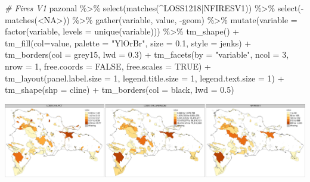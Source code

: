 \documentclass[10pt,landscape,a3paper]{article}
\newenvironment{Shaded}{\begin{snugshade}}{\end{snugshade}}
\newcommand{\AttributeTok}[1]{\textcolor[rgb]{0.77,0.63,0.00}{#1}}
\newcommand{\CommentTok}[1]{\textcolor[rgb]{0.56,0.35,0.01}{\textit{#1}}}
\newcommand{\ConstantTok}[1]{\textcolor[rgb]{0.00,0.00,0.00}{#1}}
\newcommand{\DecValTok}[1]{\textcolor[rgb]{0.00,0.00,0.81}{#1}}
\newcommand{\FloatTok}[1]{\textcolor[rgb]{0.00,0.00,0.81}{#1}}
\newcommand{\FunctionTok}[1]{\textcolor[rgb]{0.00,0.00,0.00}{#1}}
\newcommand{\NormalTok}[1]{#1}
\newcommand{\SpecialCharTok}[1]{\textcolor[rgb]{0.00,0.00,0.00}{#1}}
\newcommand{\StringTok}[1]{\textcolor[rgb]{0.31,0.60,0.02}{#1}}
\begin{document}
\begin{Shaded}
\begin{Highlighting}[]

\CommentTok{\# Fires V1}
\NormalTok{pazonal }\SpecialCharTok{\%\textgreater{}\%} \FunctionTok{select}\NormalTok{(}\FunctionTok{matches}\NormalTok{(}\StringTok{\textquotesingle{}\^{}LOSS1218|NFIRESV1\textquotesingle{}}\NormalTok{)) }\SpecialCharTok{\%\textgreater{}\%} \FunctionTok{select}\NormalTok{(}\SpecialCharTok{{-}}\FunctionTok{matches}\NormalTok{(}\StringTok{\textquotesingle{}\textless{}NA\textgreater{}\textquotesingle{}}\NormalTok{)) }\SpecialCharTok{\%\textgreater{}\%} 
  \FunctionTok{gather}\NormalTok{(variable, value, }\SpecialCharTok{{-}}\NormalTok{geom) }\SpecialCharTok{\%\textgreater{}\%}
  \FunctionTok{mutate}\NormalTok{(}\AttributeTok{variable =} \FunctionTok{factor}\NormalTok{(variable, }\AttributeTok{levels =} \FunctionTok{unique}\NormalTok{(variable))) }\SpecialCharTok{\%\textgreater{}\%} 
  \FunctionTok{tm\_shape}\NormalTok{() }\SpecialCharTok{+}
  \FunctionTok{tm\_fill}\NormalTok{(}\AttributeTok{col=}\StringTok{\textquotesingle{}value\textquotesingle{}}\NormalTok{, }\AttributeTok{palette =} \StringTok{"YlOrBr"}\NormalTok{, }\AttributeTok{size =} \FloatTok{0.1}\NormalTok{, }\AttributeTok{style =} \StringTok{\textquotesingle{}jenks\textquotesingle{}}\NormalTok{) }\SpecialCharTok{+}
  \FunctionTok{tm\_borders}\NormalTok{(}\AttributeTok{col =} \StringTok{\textquotesingle{}grey15\textquotesingle{}}\NormalTok{, }\AttributeTok{lwd =} \FloatTok{0.3}\NormalTok{) }\SpecialCharTok{+}
  \FunctionTok{tm\_facets}\NormalTok{(}\AttributeTok{by =} \StringTok{"variable"}\NormalTok{, }\AttributeTok{ncol =} \DecValTok{3}\NormalTok{, }\AttributeTok{nrow =} \DecValTok{1}\NormalTok{, }\AttributeTok{free.coords =} \ConstantTok{FALSE}\NormalTok{, }\AttributeTok{free.scales =} \ConstantTok{TRUE}\NormalTok{) }\SpecialCharTok{+}
  \FunctionTok{tm\_layout}\NormalTok{(}\AttributeTok{panel.label.size =} \DecValTok{1}\NormalTok{, }\AttributeTok{legend.title.size =} \DecValTok{1}\NormalTok{, }\AttributeTok{legend.text.size =} \DecValTok{1}\NormalTok{) }\SpecialCharTok{+} 
  \FunctionTok{tm\_shape}\NormalTok{(}\AttributeTok{shp =}\NormalTok{ cline) }\SpecialCharTok{+} \FunctionTok{tm\_borders}\NormalTok{(}\AttributeTok{col =} \StringTok{\textquotesingle{}black\textquotesingle{}}\NormalTok{, }\AttributeTok{lwd =} \FloatTok{0.5}\NormalTok{)}
\end{Highlighting}
\end{Shaded}

\begin{center}\includegraphics{img/data-download-preparation-eda/zonal-pa-10} \end{center}
\end{document}
